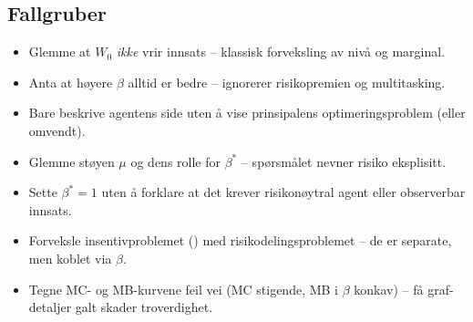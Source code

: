 \subsection*{Fallgruber}
\begin{itemize}\setlength{\itemsep}{2pt}
\item Glemme at $W_0$ \emph{ikke} vrir innsats -- klassisk forveksling av nivå og marginal.
\item Anta at høyere $\beta$ alltid er bedre -- ignorerer risikopremien og multitasking.
\item Bare beskrive agentens side uten å vise prinsipalens optimeringsproblem (eller omvendt).
\item Glemme støyen $\mu$ og dens rolle for $\beta^{*}$ -- spørsmålet nevner risiko eksplisitt.
\item Sette $\beta^{*}=1$ uten å forklare at det krever risikonøytral agent eller observerbar innsats.
\item Forveksle insentivproblemet () med risikodelingsproblemet -- de er separate, men koblet via $\beta$.
\item Tegne MC- og MB-kurvene feil vei (MC stigende, MB i $\beta$ konkav) -- få graf-detaljer galt skader troverdighet.
\end{itemize}

\FloatBarrier

